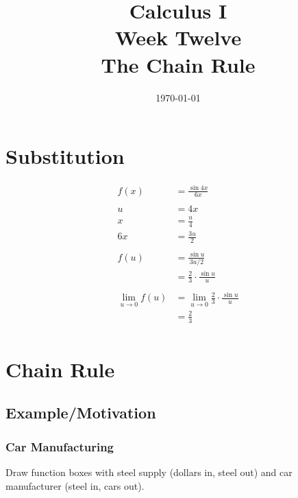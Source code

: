 \documentclass[letterpaper, landscape]{exam}
\author{}
\date{\today}
\title{Calculus I \\ Week Twelve \\ The Chain Rule}
\begin{document}
  \maketitle
  \tableofcontents

  \newpage 

  \section{Substitution} %
  
  \begin{align*}
    f(x)                & = \frac{\sin 4x}{6x} \\
    \\
    u                   & = 4x \\
    x                   & = \frac{u}{4} \\
    6x                  & = \frac{3u}{2} \\
    \\
    f(u)                & = \frac{\sin u}{3u/2} \\
                        & = \frac{2}{3} \cdot \frac{\sin u}{u} \\
    \\
    \lim_{u \to 0} f(u) & = \lim_{u \to 0} \frac{2}{3} \cdot \frac{\sin u}{u} \\
                        & = \frac{2}{3} \\
  \end{align*}

  \section{Chain Rule} %
  
  \subsection{Example/Motivation} %

  \subsubsection{Car Manufacturing} %
  
  Draw function boxes with steel supply (dollars in, steel out) and car
  manufacturer (steel in, cars out).
\end{document}
